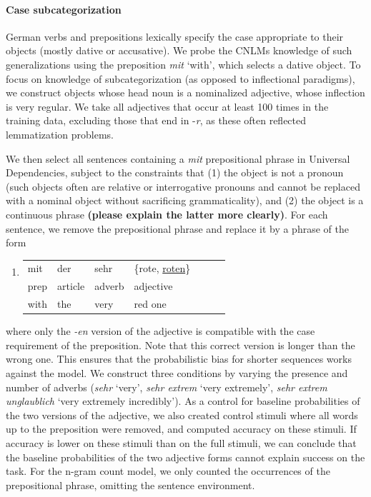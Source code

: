 \paragraph{Case subcategorization}
German verbs and prepositions lexically specify the case appropriate
to their objects (mostly dative or accusative).  We probe the CNLMs
knowledge of such generalizations using the preposition \textit{mit}
`with', which selects a dative object. To focus on knowledge of
subcategorization (as opposed to inflectional paradigms), we construct
objects whose head noun is a nominalized adjective, whose inflection
is very regular.  We take all adjectives that occur at least 100 times
in the training data, excluding those that end in -\emph{r}, as these
often reflected lemmatization problems.

We then select all sentences containing a \emph{mit} prepositional phrase in Universal Dependencies, subject to the constraints that (1) the object is not a pronoun (such objects often are relative or interrogative pronouns and cannot be replaced with a nominal object without sacrificing grammaticality), and (2) the object is a continuous phrase \textbf{(please explain the latter more clearly)}. For each sentence, we remove the prepositional phrase and replace it by a phrase of the form
\begin{enumerate}[label={(\arabic*)}]
	\item \begin{tabular}[t]{lllllll}
	mit & der & sehr& \{rote, \underline{roten}\} \\
	prep & article  & adverb & adjective \\
	with & the & very  & red one 
\end{tabular}
\end{enumerate}
where only the \emph{-en} version of the adjective is compatible with
the case requirement of the preposition. Note that this correct
version is longer than the wrong one. This ensures that the
probabilistic bias for shorter sequences works against the model.  We
construct three conditions by varying the presence and number of
adverbs (\emph{sehr} `very', \emph{sehr extrem} `very extremely',
\emph{sehr extrem unglaublich} `very extremely incredibly').  As a
control for baseline probabilities of the two versions of the
adjective, we also created control stimuli where all words up to the
preposition were removed, and computed accuracy on these stimuli.  If
accuracy is lower on these stimuli than on the full stimuli, we can
conclude that the baseline probabilities of the two adjective forms
cannot explain success on the task. For the n-gram count model, we
only counted the occurrences of the prepositional phrase, omitting the
sentence environment.

